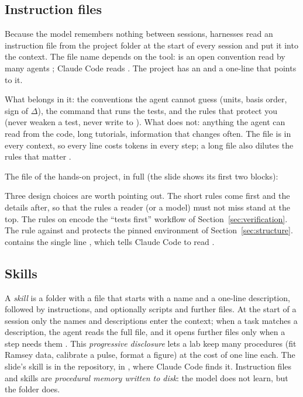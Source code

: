 \subsection{Instruction files}

Because the model remembers nothing between sessions, harnesses read an instruction file
from the project folder at the start of every session and put it into the context. The
file name depends on the tool:  is an open convention read by many agents
; Claude Code reads  . The 
project has an  and a one-line  that points to it.

What belongs in it: the conventions the agent cannot guess (units, basis order, sign of
$\Delta$), the command that runs the tests, and the rules that protect you (never weaken a
test, never write to ). What does not: anything the agent can read from
the code, long tutorials, information that changes often. The file is in every context,
so every line costs tokens in every step; a long file also dilutes the rules that matter
.

The file of the hands-on project, in full (the slide shows its first two blocks):

Three design choices are worth pointing out. The short rules come first and the details
after, so that the rules a reader (or a model) must not miss stand at the top. The rules
on  encode the ``tests first'' workflow of Section~\ref{sec:verification}. The
rule against  and  protects the pinned environment of
Section~\ref{sec:structure}.  contains the single line ,
which tells Claude Code to read .

\subsection{Skills}

A \emph{skill} is a folder with a file  that starts with a name and a
one-line description, followed by instructions, and optionally scripts and further
files. At the start of a session only the names and descriptions enter the context; when a
task matches a description, the agent reads the full file, and it opens further files
only when a step needs them . This \emph{progressive disclosure} lets a lab keep
many procedures (fit Ramsey data, calibrate a pulse, format a figure) at the cost of one
line each. The slide's  skill is in the repository, in
, where Claude Code finds it. Instruction files
and skills are \emph{procedural memory written to disk}: the model does not learn, but the
folder does.

